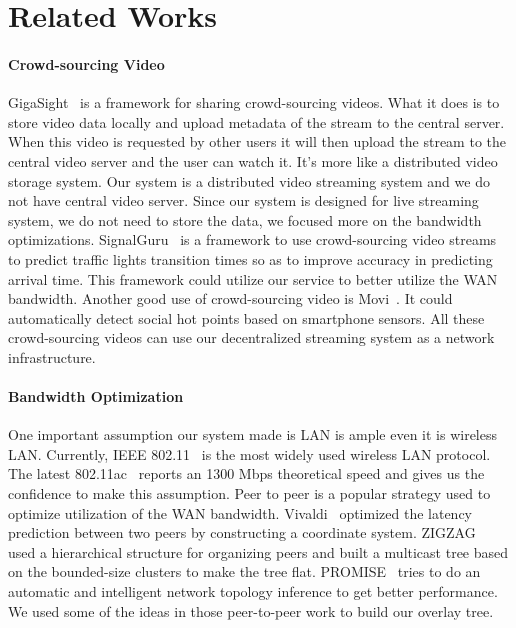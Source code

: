 \documentclass[letterpaper,twocolumn,10pt]{article}
\begin{document}
\section{Related Works}
\paragraph{Crowd-sourcing Video}
GigaSight~\cite{simoens2013scalable} is a framework for sharing crowd-sourcing videos. What it does is to store video data locally and upload metadata of the stream to the central server. When this video is requested by other users it will then upload the stream to the central video server and the user can watch it. It's more like a distributed video storage system. Our system is a distributed video streaming system and we do not have central video server. Since our system is designed for live streaming system, we do not need to store the data, we focused more on the bandwidth optimizations.
SignalGuru~\cite{koukoumidis2012leveraging} is a framework to use crowd-sourcing video streams to predict traffic lights transition times so as to improve accuracy in predicting arrival time. This framework could utilize our service to better utilize the WAN bandwidth. Another good use of crowd-sourcing video is Movi~\cite{bao2010movi}. It could automatically detect social hot points based on smartphone sensors. All these crowd-sourcing videos can use our decentralized streaming system as a network infrastructure.

\paragraph{Bandwidth Optimization}
One important assumption our system made is LAN is ample even it is wireless LAN. Currently, IEEE 802.11~\cite{crow1997ieee} is the most widely used wireless LAN protocol. The latest 802.11ac~\cite{ong2011ieee} reports an 1300 Mbps theoretical speed and gives us the confidence to make this assumption. Peer to peer is a popular strategy used to optimize utilization of the WAN bandwidth. Vivaldi~\cite{dabek2004vivaldi} optimized the latency prediction between two peers by constructing a coordinate system. ZIGZAG~\cite{tran2003zigzag} used a hierarchical structure for organizing peers and built a multicast tree based on the bounded-size clusters to make the tree flat. PROMISE~\cite{hefeeda2003promise} tries to do an automatic and intelligent network topology inference to get better performance. We used some of the ideas in those peer-to-peer work to build our overlay tree.
\end{document}
